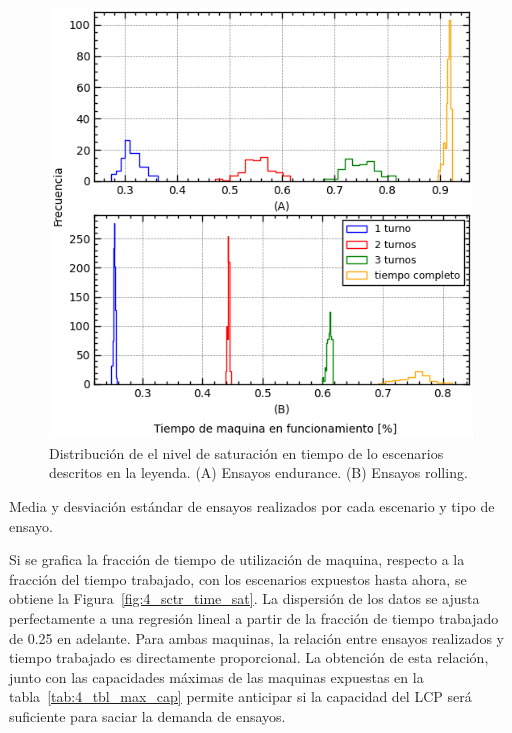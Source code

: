 \begin{figure}
	\begin{center}
		\includegraphics{fig/4_hist_time_sat}
	\end{center}
	\caption{Distribución de el nivel de saturación en tiempo de lo escenarios descritos en la leyenda.
	(A) Ensayos endurance. (B) Ensayos rolling.}
	\label{fig:4_hist_time_sat}
\end{figure}

\begin{table}
	\centering
	\caption{Media y desviación estándar de ensayos realizados por cada escenario y tipo de ensayo.}
	
	\label{tab:4_tbl_test_done}
\end{table}

Si se grafica la fracción de tiempo de utilización de maquina,
respecto a la fracción del tiempo trabajado,
con los escenarios expuestos hasta ahora,
se obtiene la Figura~\ref{fig:4_sctr_time_sat}.
La dispersión de los datos se ajusta perfectamente a una regresión lineal
a partir de la fracción de tiempo trabajado de 0.25 en adelante.
Para ambas maquinas, la relación entre ensayos realizados
y tiempo trabajado es directamente proporcional.
La obtención de esta relación,
junto con las capacidades máximas de las maquinas
expuestas en la tabla~\ref{tab:4_tbl_max_cap} permite 
anticipar si la capacidad del LCP será suficiente
para saciar la demanda de ensayos.

